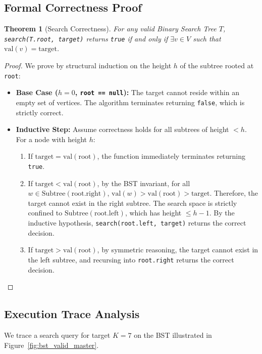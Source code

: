 \documentclass[10pt,journal,compsoc,onecolumn]{IEEEtran}
\newtheorem{theorem}{Theorem}
\begin{document}
\subsection{Formal Correctness Proof}
\begin{theorem}[Search Correctness]
For any valid Binary Search Tree $T$, \texttt{search(T.root, target)} returns \texttt{true} if and only if $\exists v \in V$ such that $\mathrm{val}(v) = \mathrm{target}$.
\end{theorem}
\begin{proof}
We prove by structural induction on the height $h$ of the subtree rooted at \texttt{root}:
\begin{itemize}
    \item \textbf{Base Case ($h = 0$, \texttt{root == null}):} The target cannot reside within an empty set of vertices. The algorithm terminates returning \texttt{false}, which is strictly correct.
    \item \textbf{Inductive Step:} Assume correctness holds for all subtrees of height $< h$. For a node with height $h$:
    \begin{enumerate}
        \item If $\mathrm{target} = \mathrm{val}(\mathrm{root})$, the function immediately terminates returning \texttt{true}.
        \item If $\mathrm{target} < \mathrm{val}(\mathrm{root})$, by the BST invariant, for all $w \in \mathrm{Subtree}(\mathrm{root.right})$, $\mathrm{val}(w) > \mathrm{val}(\mathrm{root}) > \mathrm{target}$. Therefore, the target cannot exist in the right subtree. The search space is strictly confined to $\mathrm{Subtree}(\mathrm{root.left})$, which has height $\le h - 1$. By the inductive hypothesis, \texttt{search(root.left, target)} returns the correct decision.
        \item If $\mathrm{target} > \mathrm{val}(\mathrm{root})$, by symmetric reasoning, the target cannot exist in the left subtree, and recursing into \texttt{root.right} returns the correct decision.
    \end{enumerate}
\end{itemize}
\end{proof}

\subsection{Execution Trace Analysis}

We trace a search query for target $K = 7$ on the BST illustrated in Figure~\ref{fig:bst_valid_master}.
\end{document}
